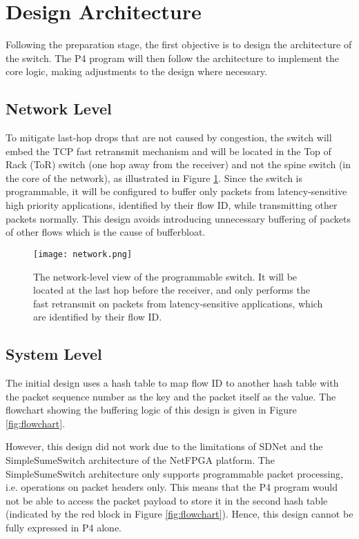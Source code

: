 \section{Design Architecture}
\label{sec:arch-design}
Following the preparation stage, the first objective is to design the architecture of the switch. The P4 program will then follow the architecture to implement the core logic, making adjustments to the design where necessary.

\subsection{Network Level}
To mitigate last-hop drops that are not caused by congestion, the switch will embed the TCP fast retransmit mechanism and will be located in the Top of Rack (ToR) switch (one hop away from the receiver) and not the spine switch (in the core of the network), as illustrated in Figure \ref{fig:network}. Since the switch is programmable, it will be configured to buffer only packets from latency-sensitive high priority applications, identified by their flow ID, while transmitting other packets normally. This design avoids introducing unnecessary buffering of packets of other flows which is the cause of bufferbloat.
\begin{figure}[!hb]
	\centering
	\texttt{[image: network.png]}
	\caption{The network-level view of the programmable switch. It will be located at the last hop before the receiver, and only performs the fast retransmit on packets from latency-sensitive applications, which are identified by their flow ID.}
	\label{fig:network}
\end{figure}

\subsection{System Level}
The initial design uses a hash table to map flow ID to another hash table with the packet sequence number as the key and the packet itself as the value. The flowchart showing the buffering logic of this design is given in Figure \ref{fig:flowchart}. 

However, this design did not work due to the limitations of SDNet and the SimpleSumeSwitch architecture of the NetFPGA platform. The SimpleSumeSwitch architecture only supports programmable packet processing, i.e. operations on packet headers only. This means that the P4 program would not be able to access the packet payload to store it in the second hash table (indicated by the red block in Figure \ref{fig:flowchart}). Hence, this design cannot be fully expressed in P4 alone.

